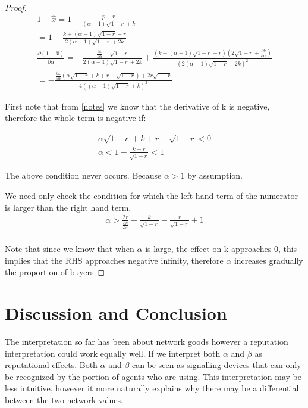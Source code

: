 \begin{proof}
\begin{align*}
1 - \hat{x}= 1 - \frac{p-r}{(\alpha - 1) \sqrt{1-r} +k} \\
= 1 - \frac{k+ (\alpha-1)\sqrt{ 1 -r }-r}{2(\alpha - 1) \sqrt{1-r} +2k} \\
\frac{\partial (1 - \hat{x})}{\partial \alpha}=  -\frac{ \frac{\partial k}{\partial \alpha}+ \sqrt{ 1 -r }}{2(\alpha - 1) \sqrt{1-r} +2k}+\frac{(k+ (\alpha-1)\sqrt{ 1 -r }-r) (2 \sqrt{1-r}+\frac{\partial k}{\partial \alpha})}{(2(\alpha - 1) \sqrt{1-r} +2k)^2} \\
=-\frac{\frac{\partial k}{\partial \alpha} \left(\alpha \sqrt{1-r}+k+r-\sqrt{1-r}\right)+2 r\sqrt{1-r} }{4 \left((\alpha-1) \sqrt{1-r}+k\right)^2}
\end{align*}

First note that from \ref{notes} we know that the derivative of k is negative, therefore the whole term is negative if:

\begin{align*}
\alpha \sqrt{1-r}+k+r-\sqrt{1-r}<0 \\
\alpha <1-\frac{k+r}{\sqrt{1-r}}<1 
\end{align*}

The above condition never occurs. Because $\alpha>1$ by assumption. 

We need only check the condition for which the left hand term of the numerator is larger than the right hand term. 
\begin{align*}
\alpha>\frac{2 r}{\frac{\partial k}{\partial \alpha}}-\frac{k}{\sqrt{1-r}}-\frac{r}{\sqrt{1-r}}+1 \\
\end{align*}

Note that since we know that when $\alpha$ is large, the effect on k approaches 0, this implies that the RHS approaches negative infinity, therefore $\alpha$ increases gradually the proportion of buyers
\end{proof}

\section{Discussion and Conclusion}
The interpretation so far has been about network goods however a reputation interpretation could work equally well. If we interpret both $\alpha$ and $\beta$ as reputational effects. Both $\alpha$ and $\beta$ can be seen as signalling devices that can only be recognized by the portion of agents who are using. This interpretation may be less intuitive, however it more naturally explains why there may be a differential between the two network values.

